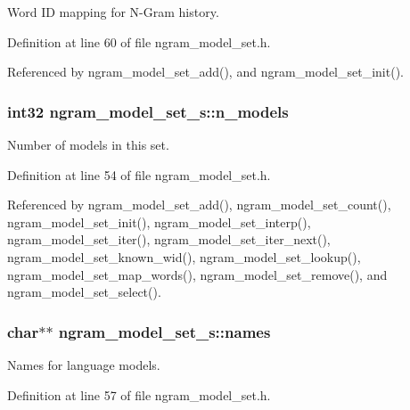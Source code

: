 Word I\+D mapping for N-\/\+Gram history. 



Definition at line 60 of file ngram\+\_\+model\+\_\+set.\+h.



Referenced by ngram\+\_\+model\+\_\+set\+\_\+add(), and ngram\+\_\+model\+\_\+set\+\_\+init().

\subsubsection[{n\+\_\+models}]{\setlength{\rightskip}{0pt plus 5cm}int32 ngram\+\_\+model\+\_\+set\+\_\+s\+::n\+\_\+models}\label{structngram__model__set__s_a6c28858d5631a9c9dbc7b2c9583f5c5a}


Number of models in this set. 



Definition at line 54 of file ngram\+\_\+model\+\_\+set.\+h.



Referenced by ngram\+\_\+model\+\_\+set\+\_\+add(), ngram\+\_\+model\+\_\+set\+\_\+count(), ngram\+\_\+model\+\_\+set\+\_\+init(), ngram\+\_\+model\+\_\+set\+\_\+interp(), ngram\+\_\+model\+\_\+set\+\_\+iter(), ngram\+\_\+model\+\_\+set\+\_\+iter\+\_\+next(), ngram\+\_\+model\+\_\+set\+\_\+known\+\_\+wid(), ngram\+\_\+model\+\_\+set\+\_\+lookup(), ngram\+\_\+model\+\_\+set\+\_\+map\+\_\+words(), ngram\+\_\+model\+\_\+set\+\_\+remove(), and ngram\+\_\+model\+\_\+set\+\_\+select().

\subsubsection[{names}]{\setlength{\rightskip}{0pt plus 5cm}char$\ast$$\ast$ ngram\+\_\+model\+\_\+set\+\_\+s\+::names}\label{structngram__model__set__s_aff5e13c45decde4c5bf30d8aa2b1c7d9}


Names for language models. 



Definition at line 57 of file ngram\+\_\+model\+\_\+set.\+h.



